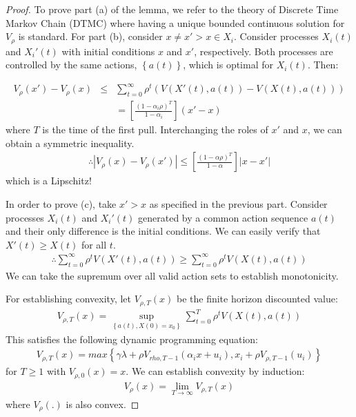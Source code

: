 \documentclass[conference]{IEEEtran}
\begin{document}
\begin{proof}
To prove part (a) of the lemma, we refer to the theory of Discrete Time Markov Chain (DTMC) where having a unique bounded continuous solution for $V_\rho$ is standard. For part (b), consider $x \neq {x}'>x \in X_i$. Consider processes $X_i(t)$ and ${X_i}'(t)$ with initial conditions $x$ and ${x}'$, respectively. Both processes are controlled by the same actions, $\left \{ a(t) \right \}$, which is optimal for $X_i(t)$. Then:

\begin{eqnarray*}
    V_\rho({x}')-V_\rho(x) & \leq & \sum_{t=0}^{\infty} \rho^{t}(V({X}'(t), a(t))-V(X(t), a(t))) \\  
                           & & = \left [\frac{(1-\alpha_i\rho)^{T}}{1-\alpha_i} \right]({x}'-x)
\end{eqnarray*}
where $T$ is the time of the first pull. Interchanging the roles of ${x}'$ and $x$, we can obtain a symmetric inequality. 
\begin{eqnarray*}
\therefore{}|V_\rho(x)-V_\rho({x}')| \leq \left [\frac{(1-\alpha\rho)^{T}}{1-\alpha} \right ] \left |x-{x}' \right |
\end{eqnarray*}
which is a Lipschitz!

In order to prove (c), take ${x}' > x$ as specified in the previous part. Consider processes $X_i(t)$ and ${X_i}'(t)$ generated by a common action sequence $a(t)$ and their only difference is the initial conditions. We can easily verify that ${X}'(t) \geq X(t)$ for all $t$.
\begin{eqnarray*}
\therefore \sum_{t=0}^{\infty}\rho^t V({X}'(t), a(t)) \geq \sum_{t=0}^{\infty}\rho^t V(X(t), a(t))
\end{eqnarray*}
We can take the supremum over all valid action sets to establish monotonicity.

For establishing convexity, let $V_{\rho, T}(x)$ be the finite horizon discounted value: 
\begin{eqnarray*}
V_{\rho,T}(x)= \sup_{\left\{a(t), X(0)=x_0\right\}} \sum_{t=0}^{T} \rho^{t} V(X(t), a(t))
\end{eqnarray*}
This satisfies the following dynamic programming equation: 
\begin{eqnarray*}
V_{\rho, T}(x) = max \left \{\gamma \lambda + \rho V_{rho, T-1}(\alpha_i x + u_i), x_i + \rho V_{\rho, T-1}(u_i) \right \}
\end{eqnarray*}
for $T \geq 1$ with $V_{\rho,0}(x)=x$. We can establish convexity by induction: 
\begin{eqnarray*}
V_{\rho} (x) = \lim_{T \rightarrow \infty} V_{\rho, T}(x)
\end{eqnarray*}
where $V_\rho(.)$ is also convex.
\end{proof}
\end{document}

